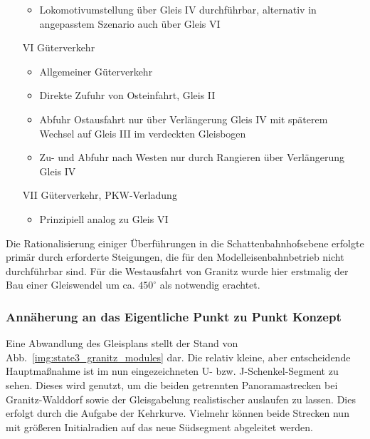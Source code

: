 \begin{itemize}
\begin{itemize}
		\item Lokomotivumstellung \"uber Gleis IV durchf\"uhrbar, alternativ in angepasstem Szenario auch \"uber Gleis VI
	\end{itemize}
	\item[VI] G\"uterverkehr
	\begin{itemize}
		\item Allgemeiner G\"uterverkehr
		\item Direkte Zufuhr von Osteinfahrt, Gleis II
		\item Abfuhr Ostausfahrt nur \"uber Verl\"angerung Gleis IV mit sp\"aterem Wechsel auf Gleis III im verdeckten Gleisbogen
		\item Zu- und Abfuhr nach Westen nur durch Rangieren \"uber Verl\"angerung Gleis IV
	\end{itemize}
	\item[VII] G\"uterverkehr, PKW-Verladung
	\begin{itemize}
		\item Prinzipiell analog zu Gleis VI
	\end{itemize}
\end{itemize}
	
Die Rationalisierung einiger \"Uberf\"uhrungen in die Schattenbahnhofsebene erfolgte prim\"ar durch erforderte Steigungen, die f\"ur den Modelleisenbahnbetrieb nicht durchf\"uhrbar sind.
F\"ur die Westausfahrt von Granitz wurde hier erstmalig der Bau einer Gleiswendel um ca. $450^{\circ}$ als notwendig erachtet.



\subsubsection{Ann\"aherung an das Eigentliche Punkt zu Punkt Konzept}
\label{sec:map_development_state3}

Eine Abwandlung des Gleisplans stellt der Stand von Abb.~\ref{img:state3_granitz_modules} dar.
Die relativ kleine, aber entscheidende Hauptma{\ss}nahme ist im nun eingezeichneten U- bzw. J-Schenkel-Segment zu sehen.
Dieses wird genutzt, um die beiden getrennten Panoramastrecken bei Granitz-Walddorf sowie der Gleisgabelung realistischer auslaufen zu lassen.
Dies erfolgt durch die Aufgabe der Kehrkurve.
Vielmehr k\"onnen beide Strecken nun mit gr\"o{\ss}eren Initialradien auf das neue S\"udsegment abgeleitet werden.

